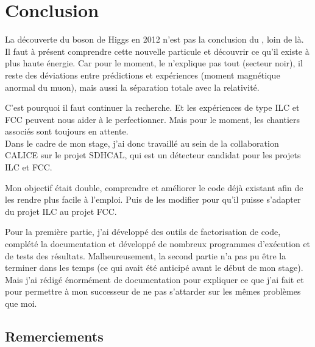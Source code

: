 
\chapter{Conclusion}


La découverte du boson de Higgs en 2012 n'est pas la conclusion du \MS, loin de là. 
Il faut à présent comprendre cette nouvelle particule et découvrir ce qu'il existe à plus haute énergie.
Car pour le moment, le \MS n'explique pas tout (secteur noir), il reste des déviations entre prédictions et expériences (moment magnétique anormal du muon), mais aussi la séparation totale avec la relativité.

C'est pourquoi il faut continuer la recherche.
Et les expériences de type ILC et FCC peuvent nous aider à le perfectionner. 
Mais pour le moment, les chantiers associés sont toujours en attente. \\


Dans le cadre de mon stage, j'ai donc travaillé au sein de la collaboration CALICE sur le projet SDHCAL, qui est un détecteur candidat pour les projets ILC et FCC. 

Mon objectif était double, comprendre et améliorer le code déjà existant afin de les rendre plus facile à l'emploi. Puis de les modifier pour qu'il puisse s'adapter du projet ILC au projet FCC.

Pour la première partie, j'ai développé des outils de factorisation de code, complété la documentation et développé de nombreux programmes d'exécution et de tests des résultats.
Malheureusement, la second partie n'a pas pu être la terminer dans les temps (ce qui avait été anticipé avant le début de mon stage). 
Mais j'ai rédigé énormément de documentation pour expliquer ce que j'ai fait et pour permettre à mon successeur de ne pas s'attarder sur les mêmes problèmes que moi.


\section*{Remerciements}

